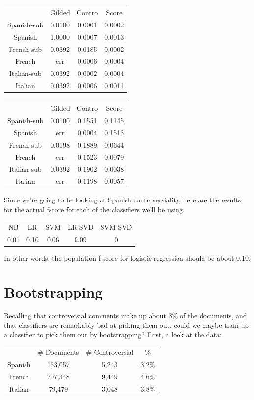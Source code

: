 \documentclass[11pt]{article} %
\begin{document}
\begin{tabular}{|c|c|c|c|}
\rowcolor{gray!50}\multicolumn{4}{|c|}{naive bayes} \\
& Gilded&Contro&Score \\
Spanish-sub & 0.0100& 0.0001& 0.0002\\
Spanish & 1.0000& 0.0007& 0.0013\\
French-sub & 0.0392& 0.0185& 0.0002\\
French & err& 0.0006& 0.0004\\
Italian-sub & 0.0392& 0.0002& 0.0004\\
Italian & 0.0392& 0.0006& 0.0011\\
\end{tabular}
\quad {}
\begin{tabular}{|c|c|c|c|}
\rowcolor{gray!50}\multicolumn{4}{|c|}{logistic regression} \\
& Gilded&Contro&Score \\
Spanish-sub & 0.0100& 0.1551& 0.1145\\
Spanish & err& 0.0004& 0.1513\\
French-sub & 0.0198& 0.1889& 0.0644\\
French & err& 0.1523& 0.0079\\
Italian-sub & 0.0392& 0.1902& 0.0038\\
Italian & err& 0.1198& 0.0057\\
\end{tabular}

Since we're going to be looking at Spanish controversiality, here are the results for the actual fscore for each of the classifiers we'll be using.\\
\begin{tabular}{|*{5}{c|}}
NB & LR & SVM & LR SVD & SVM SVD \\
0.01 & 0.10 & 0.06 & 0.09 & 0 \end{tabular}
In other words, the population f-score for logistic regression should be about 0.10. 

\section{Bootstrapping}
Recalling that controversial comments make up about 3\% of the documents, and that classifiers are remarkably bad at picking them out, could we maybe train up a classifier to pick them out by bootstrapping? First, a look at the data:\\
\begin{tabular}{|c|c|c|c|}
\rowcolor{gray!50} & \# Documents & \# Controversial & \% \\
Spanish & 163,057 & 5,243 & 3.2\% \\
French & 207,348 & 9,449 & 4.6\% \\
Italian & 79,479 & 3,048 & 3.8\% \end{tabular}\\
\end{document}
